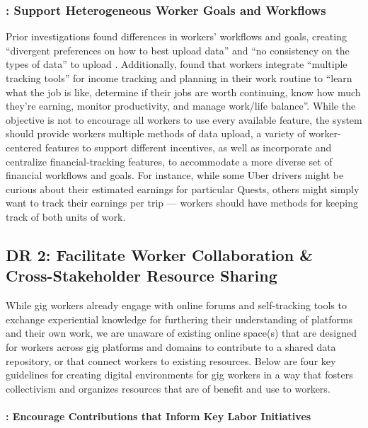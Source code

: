 \subsubsection*{: \textbf{Support Heterogeneous Worker Goals and Workflows}}
\label{DR1.3}
Prior investigations found differences in workers' workflows and goals, {creating ``divergent preferences on how to best upload data''} \cite{supporting} {and ``no consistency on the types of data'' to upload \cite{uuapp}}. 
{Additionally, \citet{accountable} found that workers integrate ``multiple tracking tools''
for income tracking and planning in their work routine to ``learn what the job is like, determine if their jobs are worth continuing, know how much they’re earning, monitor productivity, and manage work/life balance''.}
{While the objective is not to encourage all workers to use every available feature, }the system should provide workers multiple methods of data upload, a variety of worker-centered features to support different incentives{, as well as incorporate and centralize financial-tracking features}, to accommodate a more diverse set of {financial} workflows and goals.
For instance, while some Uber drivers might be curious about their estimated earnings for particular Quests, others might simply want to track their earnings per trip {\cite{zhang2023stakeholder}} --- workers should have methods for keeping track of both units of work. 


\subsection{DR 2: Facilitate Worker Collaboration \& {Cross-Stakeholder} Resource Sharing}
\label{DR2}
{While} gig workers {already} engage with online forums \cite{atom} and self-tracking tools \cite{accountable} {to exchange experiential knowledge for furthering their understanding of platforms and their own work,} {we are unaware of existing }online space{(s)} {that are designed for workers across gig platforms and domains to} contribute to a shared data repository, or {that connect workers to existing resources}. Below are four key guidelines for creating digital environments for gig workers in a way that fosters collectivism and organizes resources {that are} of benefit and use to workers.

\paragraph{: \textbf{Encourage {Contributions that Inform Key Labor} {Initiatives}}} 


